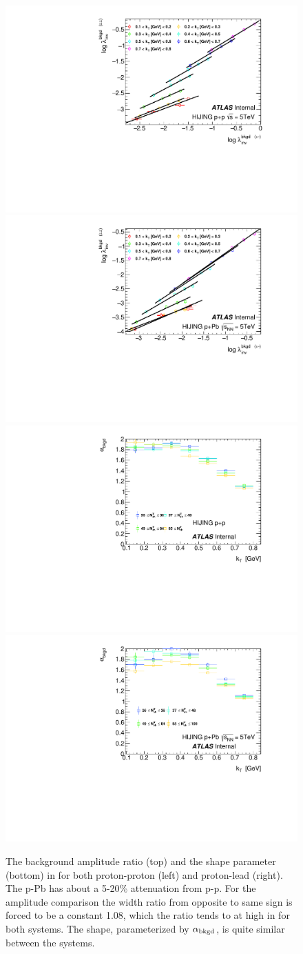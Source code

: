 \begin{figure}[t]
\begin{minipage}[t]{1.0\textwidth}
\centering
\includegraphics[width=.49\linewidth]{backLambda_charge_comp_ppHijing.pdf}
\includegraphics[width=.49\linewidth]{backLambda_charge_comp_pPbHijing.pdf}\\
\includegraphics[width=.49\linewidth]{qinv_backAlpha_vs_kt_ppHijing.pdf}
\includegraphics[width=.49\linewidth]{qinv_backAlpha_vs_kt_pPbHijing.pdf}\\

\end{minipage}
\caption{The background amplitude ratio (top) and the shape parameter (bottom) in \Hijing for both proton-proton (left) and proton-lead (right). The p-Pb has about a 5-20\% attenuation from p-p. For the amplitude comparison the width ratio from opposite to same sign is forced to be a constant 1.08, which the ratio tends to at high \kt in \Hijing for both systems. The shape, parameterized by $\alpha_{\mathrm{bkgd}}$, is quite similar between the systems.}
\label{fig:background_pp_ppb_comp}
\end{figure}

